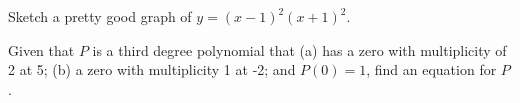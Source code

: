 \documentclass[12pt,fleqn]{exam}
\begin{document}
\begin{questions}

\vfill
\newpage

\question Sketch a pretty good graph of $y = (x-1)^2 (x+1)^2$.
\begin{solution}[3.25in]
    
\end{solution}

\question [1]  Given that $P$ is a third degree polynomial that
(a) has a zero with multiplicity of 2 at 5; (b) a zero with multiplicity 1 
at -2; and $P(0) = 1$, find an equation for $P$.
\end{questions}
\end{document}
